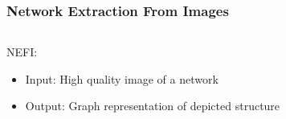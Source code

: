 \documentclass[	hyperref={pdfpagelabels=false}, xcolor=dvipsnames,
		11pt]{beamer}
\begin{document}
\begin{frame}
    \frametitle{Network Extraction From Images} 


	\begin{columns}
	\begin{column}{4cm}

	\begin{overprint}

	  
		\begin{block}{NEFI:}
		  \begin{itemize}
		   \item Input: High quality image of a network
		   \item Output: Graph representation of depicted structure
		  \end{itemize}
		\end{block}


	\end{overprint}

	\end{column}

	\begin{column}{3cm}
	\begin{overprint}


\end{overprint}
\end{column}
\end{columns}
\end{frame}
\end{document}
